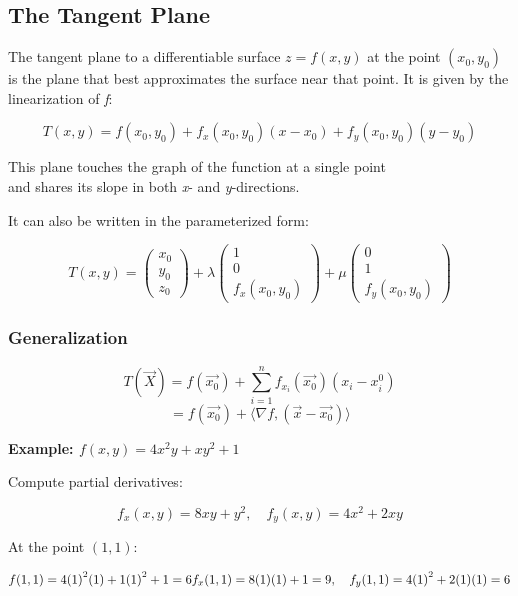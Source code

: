 \subsection{The Tangent Plane}

The tangent plane to a differentiable surface \( z = f(x, y) \) at the point \( (x_0, y_0) \) is the 
plane that best approximates the surface near that point. It is given by the linearization of \emph{f}:

\[
    T(x, y) = f(x_0, y_0) + f_x(x_0, y_0)(x - x_0) + f_y(x_0, y_0)(y - y_0)
\]

This plane touches the graph of the function at a single point\\
and shares its slope in both \emph{x}- and \emph{y}-directions.

It can also be written in the parameterized form:

\[
    T(x,y) = \begin{pmatrix} x_0\\ y_0\\ z_0\end{pmatrix} + \lambda 
    \begin{pmatrix} 1\\ 0 \\ f_x(x_0,y_0)\end{pmatrix} + \mu \begin{pmatrix}
    0 \\ 1 \\ f_y(x_0, y_0)
    \end{pmatrix}
\]

\subsubsection{Generalization}

\[
    T(\vec{X}) = f(\vec{x_0}) + \sum_{i = 1}^{n} f_{x_i}(\vec{x_0})(x_i - x_{i}^0)
\]
\[
    = f(\vec{x_0}) + \langle \nabla f, (\vec{x} - \vec{x_0})\rangle
\]

\textbf{Example: \( f(x, y) = 4x^2y + xy^2 + 1 \)}
\vspace{\baselineskip}

Compute partial derivatives:

\[
    f_x(x, y) = 8xy + y^2, \quad f_y(x, y) = 4x^2 + 2xy
\]

At the point \( (1, 1) \):

\[
    f(1, 1) = 4{(1)}^2(1) + 1{(1)}^2 + 1 = 6 \\
    f_x(1, 1) = 8(1)(1) + 1 = 9, \quad f_y(1, 1) = 4{(1)}^2 + 2(1)(1) = 6
\]

